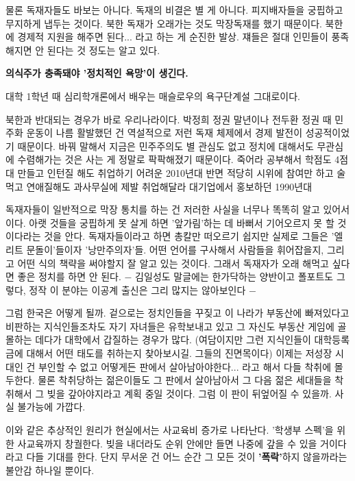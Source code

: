 물론 독재자들도 바보는 아니다.
독재의 비결은 별 게 아니다. 피지배자들을 궁핍하고 무지하게 냅두는 것이다.
북한 독재가 오래가는 것도 막장독재를 했기 때문이다.
북한에 경제적 지원을 해주면 된다... 라고 하는 게 순진한 발상.
쟤들은 절대 인민들이 풍족해지면 안 된다는 것 정도는 알고 있다.
\vspace{5mm}

\textbf{의식주가 충족돼야  '정치적인 욕망'이 생긴다.}
\vspace{5mm}

대학 1학년 때 심리학개론에서 배우는 매슬로우의 욕구단계설 그대로이다.
\vspace{5mm}

북한과 반대되는 경우가 바로 우리나라이다.
박정희 정권 말년이나 전두환 정권 때 민주화 운동이 나름 활발했던 건
역설적으로 저런 독재 체제에서 경제 발전이 성공적이었기 때문이다.
바꿔 말해서 지금은 민주주의도 별 관심도 없고 정치에 대해서도 무관심에 수렴해가는 것은 사는 게 정말로 팍팍해졌기 때문이다.
죽어라 공부해서 학점도 4점대 만들고 인턴질 해도 취업하기 어려운 2010년대
반면 적당히 시위에 참여만 하고 술먹고 연애질해도 과사무실에 제발 취업해달라 대기업에서 홍보하던 1990년대
\vspace{5mm}

독재자들이 일반적으로 막장 통치를 하는 건 저러한 사실을 너무나 똑똑히 알고 있어서이다.
아랫 것들을 궁핍하게 못 살게 하면 '앞가림'하는 데 바뻐서 기어오르지 못 할 것이다라는 것을 안다.
독재자들이라고 하면 총칼만 떠오르기 쉽지만 실제로 그들은 '엘리트 문돌이'들이자 '낭만주의자'들.
어떤 언어를 구사해서 사람들을 휘어잡을지, 그리고 어떤 식의 책략을 써야할지 잘 알고 있는 것이다.
그래서 독재자가 오래 해먹고 싶다면 좋은 정치를 하면 안 된다.
$-$ 김일성도 말글에는 한가닥하는 양반이고 폴포트도 그렇다, 정작 이 분야는 이공계 출신은 그리 많지는 않아보인다 $-$
\vspace{5mm}

그럼 한국은 어떻게 될까.
겉으로는 정치인들을 꾸짖고 이 나라가 부동산에 빠져있다고 비판하는 지식인들조차도
자기 자녀들은 유학보내고 있고 그 자신도 부동산 게임에 골몰하는 데다가 대학에서 갑질하는 경우가 많다.
(여담이지만 그런 지식인들이 대학등록금에 대해서 어떤 태도를 취하는지 찾아보시길. 그들의 진면목이다)
이제는 저성장 시대인 건 부인할 수 없고 어떻게든 판에서 살아남아야한다... 라고 해서 다들 착취에 몰두한다.
물론 착취당하는 젊은이들도 그 판에서 살아남아서 그 다음 젊은 세대들을 착취해서 그 빚을 갚아야지라고 계획 중일 것이다.
그럼 이 판이 뒤엎어질 수 있을까. 사실 불가능에 가깝다.
\vspace{5mm}

이와 같은 추상적인 원리가 현실에서는 사교육비 증가로 나타난다. '학생부 스펙'을 위한 사교육까지 창궐한다.
빚을 내더라도 순위 안에만 들면 나중에 갚을 수 있을 거이다라고 다들 기대를 한다.
단지 무서운 건 어느 순간 그 모든 것이 \textbf{'폭락'}하지 않을까라는 불안감 하나일 뿐이다.
\vspace{5mm}


